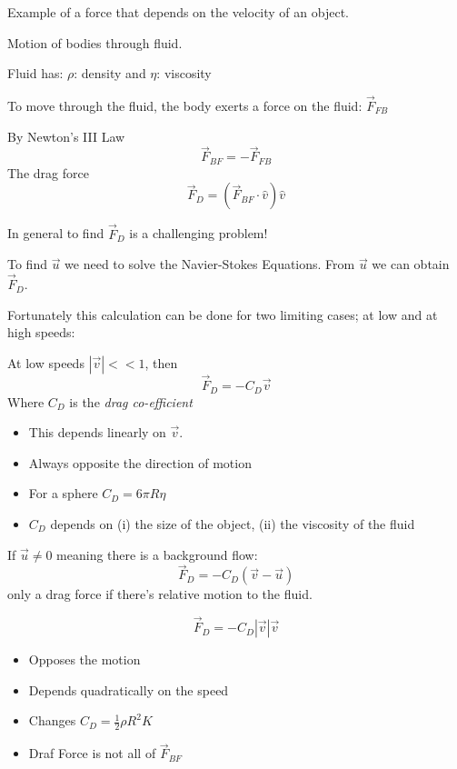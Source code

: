 \setcounter{lecture}{3}


Example of a force that depends on the velocity of an object. 

Motion of bodies through fluid. 
\vspace*{100pt}

Fluid has: $\rho$: density and $\eta$: viscosity

To move through the fluid, the body exerts a force on the fluid: $\vec{F}_{FB}$

By Newton's III Law
\[\vec{F}_{BF} = -\vec{F}_{FB}\]
The drag force \[\vec{F}_D = (\vec{F}_{BF}\cdot \hat{v})\hat{v}\]

In general to find $\vec{F}_{D}$ is a challenging problem!

To find $\vec{u}$ we need to solve the Navier-Stokes Equations. From $\vec{u}$ we can obtain $\vec{F}_D$. 

Fortunately this calculation can be done for two limiting cases; at low and at high speeds:

At low speeds $|\vec{v}| << 1$, then 
\[\vec{F}_D = -C_D\vec{v}\]
Where $C_D$ is the \emph{drag co-efficient}

\begin{itemize}
\item This depends linearly on $\vec{v}$.
\item Always opposite the direction of motion
\item For a sphere $C_D = 6\pi R\eta$
\item $C_D$ depends on (i) the size of the object, (ii) the viscosity of the fluid
\end{itemize}
If $\vec{u} \neq 0$ meaning there is a background flow:
\[\vec{F}_D = -C_D(\vec{v} - \vec{u})\]
only a drag force if there's relative motion to the fluid.

\[\vec{F}_D = -C_D|\vec{v}|\vec{v}\]
\begin{itemize}
\item Opposes the motion
\item Depends quadratically on the speed
\item Changes $C_D = \frac{1}{2}\rho R^2K$
\item Draf Force is not all of $\vec{F}_{BF}$
\end{itemize}


